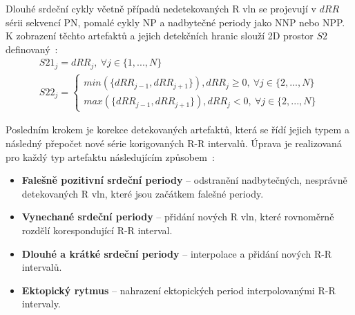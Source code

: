 Dlouhé srdeční cykly včetně případů nedetekovaných R vln se projevují v $dRR$
sérii sekvencí PN, pomalé cykly NP a nadbytečné periody jako NNP nebo NPP. K
zobrazení těchto artefaktů a jejich detekčních hranic slouží 2D prostor $S2$
definovaný~\cite{Lipponen2019}:
\begin{gather}
    S21_j = dRR_j, ~\forall j \in \{1,...,N\} \nonumber \\
    S22_j =
    \begin{cases}
        min(\{dRR_{j-1}, dRR_{j+1}\}), dRR_j \geq 0, ~\forall j \in \{2,...,N\} \\
        max(\{dRR_{j-1}, dRR_{j+1}\}), dRR_j < 0, ~\forall j \in \{2,...,N\}
    \end{cases}
    \label{eq:subspace2}
\end{gather}

Posledním krokem je korekce detekovaných artefaktů, která se řídí jejich typem a
následný přepočet nové série korigovaných R-R intervalů. Úprava je realizovaná
pro každý typ artefaktu následujícím způsobem~\cite{Lipponen2019}:
\begin{itemize}
    \item \textbf{Falešně pozitivní srdeční periody} -- odstranění
          nadbytečných, nesprávně detekovaných R vln, které jsou začátkem falešné
          periody.
    \item \textbf{Vynechané srdeční periody} -- přidání nových R vln, které
          rovnoměrně rozdělí korespondující R-R interval.
    \item \textbf{Dlouhé a krátké srdeční periody} -- interpolace a přidání
          nových R-R intervalů.
    \item \textbf{Ektopický rytmus} -- nahrazení ektopických period interpolovanými R-R intervaly.
\end{itemize}

